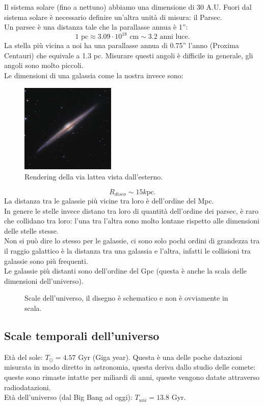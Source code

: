 Il sistema solare (fino a nettuno) abbiamo una dimensione di 30 A.U. Fuori dal sistema solare è necessario definire un'altra unità di misura: il Parsec.\\
Un parsec è una distanza tale che la parallasse annua è 1'':
\[
	1 \text{ pc} \approx 3.09 \cdot 10^{18} \text{ cm} \sim 3.2 \text{ anni luce}
.\] 
La stella più vicina a noi ha una parallasse annua di 0.75'' l'anno (Proxima Centauri) che equivale a 1.3 pc. Misurare questi angoli è difficile in generale, gli angoli sono molto piccoli.\\
Le dimensioni di una galassia come la nostra invece sono:\\
\begin{figure}[H]
	\centering
	\includegraphics[width=0.4\textwidth]{figures/vialattea.jpeg}
	\caption{Rendering della via lattea vista dall'esterno.}
	\label{fig:figures-vialattea-jpeg}
\end{figure}
\[
	R_{disco} \sim 15 k\text{pc}
.\]
La distanza tra le galassie più vicine tra loro è dell'ordine del Mpc.\\
In genere le stelle invece distano tra loro di quantità dell'ordine dei parsec, è raro che collidano tra loro: l'una tra l'altra sono molto lontane rispetto alle dimensioni delle stelle stesse.\\ 
Non si può dire lo stesso per le galassie, ci sono solo pochi ordini di grandezza tra il raggio galattico è la distanza tra una galassia e l'altra, infatti le collisioni tra galassie sono più frequenti.\\
Le galassie più distanti sono dell'ordine del Gpc (questa è anche la scala delle dimensioni dell'universo).\\
\begin{figure}[H]
    \centering
    \caption{\scriptsize Scale dell'universo, il disegno è schematico e non è ovviamente in scala.}
    \label{fig:scale-dell'universo}
\end{figure}
\noindent

\subsection{Scale temporali dell'universo}%
Età del sole: $T_{\odot} = 4.57$ Gyr (Giga year). Questa è una delle poche datazioni misurata in modo diretto in astronomia, questa deriva dallo studio delle comete: queste sono rimaste intatte per miliardi di anni, queste vengono datate attraverso radiodatazioni.\\
Età dell'universo (dal Big Bang ad oggi): $T_{uni}= 13.8$ Gyr.

